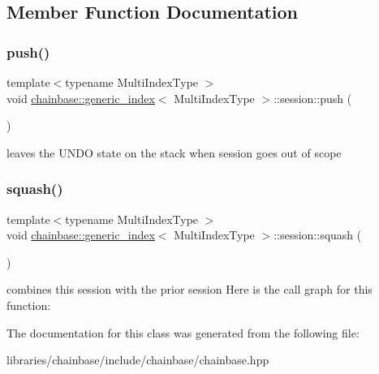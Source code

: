 \subsection{Member Function Documentation}
\mbox{\label{classchainbase_1_1generic__index_1_1session_aa3b4c98efecade257b5d72e44fb79de0}} 
\subsubsection{\texorpdfstring{push()}{push()}}
{\footnotesize\ttfamily template$<$typename Multi\+Index\+Type $>$ \\
void \mbox{\hyperlink{classchainbase_1_1generic__index}{chainbase\+::generic\+\_\+index}}$<$ Multi\+Index\+Type $>$\+::session\+::push (\begin{DoxyParamCaption}{ }\end{DoxyParamCaption})\hspace{0.3cm}{\ttfamily [inline]}}

leaves the U\+N\+DO state on the stack when session goes out of scope \mbox{\label{classchainbase_1_1generic__index_1_1session_a0fd198ec07cc3313e51b30ae7699246c}} 
\subsubsection{\texorpdfstring{squash()}{squash()}}
{\footnotesize\ttfamily template$<$typename Multi\+Index\+Type $>$ \\
void \mbox{\hyperlink{classchainbase_1_1generic__index}{chainbase\+::generic\+\_\+index}}$<$ Multi\+Index\+Type $>$\+::session\+::squash (\begin{DoxyParamCaption}{ }\end{DoxyParamCaption})\hspace{0.3cm}{\ttfamily [inline]}}

combines this session with the prior session Here is the call graph for this function\+:


The documentation for this class was generated from the following file\+:\begin{DoxyCompactItemize}
\item 
libraries/chainbase/include/chainbase/chainbase.\+hpp\end{DoxyCompactItemize}
